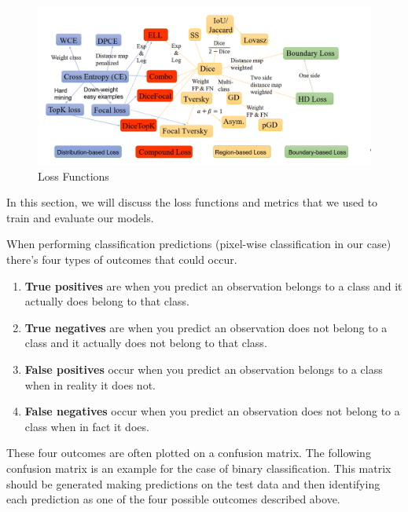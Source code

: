 \begin{figure}[H]
\centering
  \vspace{-0.1in}
    \centerline{\includegraphics[width = \linewidth]{../images/LossFunctions.png}}
    \caption{Loss Functions}
    \label{fig:LossFunctions}
\end{figure}

In this section, we will discuss the loss functions and metrics that we used to train and evaluate our models.

When performing classification predictions (pixel-wise classification in our case) there's four types of outcomes that could occur.

\begin{enumerate}
    \item \textbf{True positives} are when you predict an observation belongs to a class and it actually does belong to that class.
    \item \textbf{True negatives} are when you predict an observation does not belong to a class and it actually does not belong to that class.
    \item \textbf{False positives} occur when you predict an observation belongs to a class when in reality it does not.
    \item \textbf{False negatives} occur when you predict an observation does not belong to a class when in fact it does.
\end{enumerate}

These four outcomes are often plotted on a confusion matrix. The following confusion matrix is an example for the case of binary classification. This matrix should be generated making predictions on the test data and then identifying each prediction as one of the four possible outcomes described above.

\vspace{0.1in}



